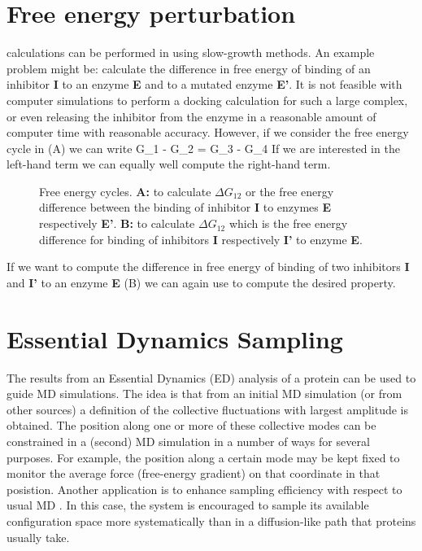 \section{Free energy perturbation}
\label{sec:fepalg}
 calculations can be performed
in {\gromacs} using slow-growth methods. An example problem might be:
calculate the difference in free energy of binding of an inhibitor {\bf I}
to an enzyme {\bf E} and to a mutated enzyme {\bf E'}.
It is not feasible with computer simulations to perform a docking
calculation for such a large complex, or even releasing the inhibitor from
the enzyme in a reasonable amount of computer time with reasonable accuracy.
However, if we consider the free energy cycle in (A)
we can write
\beq
\Delta G_1 - \Delta G_2	=	\Delta G_3 - \Delta G_4
\label{eqn:ddg}
\eeq
If we are interested in the left-hand term we can equally well compute
the right-hand term.
\begin{figure}
\centerline{\hspace{2cm}}
\caption[Free energy cycles.]{Free energy cycles. {\bf A:} to
calculate $\Delta G_{12}$ or the free energy difference between the
binding of inhibitor {\bf I} to enzymes {\bf E} respectively {\bf
E'}. {\bf B:} to calculate $\Delta G_{12}$ which is the free energy
difference for binding of inhibitors {\bf I} respectively {\bf I'} to
enzyme {\bf E}.}
\label{fig:free}
\end{figure}

If we want to compute the difference in free energy of binding of two
inhibitors {\bf I} and {\bf I'} to an enzyme {\bf E} (B)
we can again use  to compute the desired property.

\section{Essential Dynamics Sampling}
The results from an Essential Dynamics (ED) analysis \cite{Amadei93}
of a protein can be used to guide MD simulations. The idea is that
from an initial MD simulation (or from other sources) a definition of
the collective fluctuations with largest amplitude is obtained. The
position along one or more of these collective modes can be
constrained in a (second) MD simulation in a number of ways for
several purposes. For example, the position along a certain mode may
be kept fixed to monitor the average force (free-energy gradient) on
that coordinate in that posistion. Another application is to enhance
sampling efficiency with respect to usual MD
\cite{Degroot96a,Degroot96b}. In this case, the system is encouraged
to sample its available configuration space more systematically than
in a diffusion-like path that proteins usually take.

